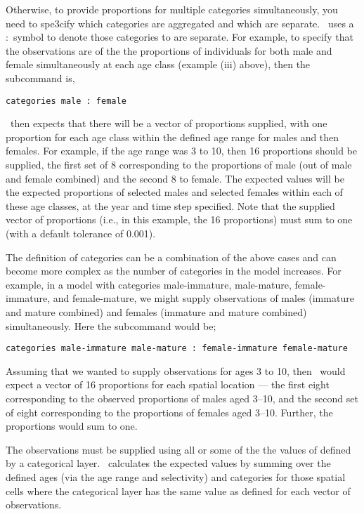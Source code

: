 Otherwise, to provide proportions for multiple categories simultaneously, you need to spe3cify which categories are aggregated and which are separate. \SPM\ uses a $:$ symbol to denote those categories to are separate. For example, to specify that the observations are of the the proportions of individuals for both male and female simultaneously at each age class (example (iii) above), then the subcommand  is,

\begin{verbatim}
categories male : female
\end{verbatim}

\SPM\ then expects that there will be a vector of proportions supplied, with one proportion for each age class within the defined age range for males and then females. For example, if the age range was 3 to 10, then 16 proportions should be supplied, the first set of 8 corresponding to the proportions of male (out of male and female combined) and the second 8 to female. The expected values will be the expected proportions of selected males and selected females within each of these age classes, at the year and time step specified. Note that the supplied vector of proportions (i.e., in this example, the 16 proportions) must sum to one (with a default tolerance of 0.001).

The definition of categories can be a combination of the above cases and can become more complex as the number of categories in the model increases. For example, in a model with categories male-immature, male-mature, female-immature, and female-mature, we might supply observations of males (immature and mature combined) and females (immature and mature combined) simultaneously. Here the  subcommand would be;

\begin{verbatim}
categories male-immature male-mature : female-immature female-mature
\end{verbatim}

Assuming that we wanted to supply observations for ages 3 to 10, then \SPM\ would expect a vector of 16 proportions for each spatial location --- the first eight corresponding to the observed proportions of males aged 3--10, and the second set of eight corresponding to the proportions of females aged 3--10. Further, the proportions would sum to one.

The observations must be supplied using all or some of the the values of defined by a categorical layer. \SPM\ calculates the expected values by summing over the defined ages (via the age range and selectivity) and categories for those spatial cells where the categorical layer has the same value as defined for each vector of observations.

